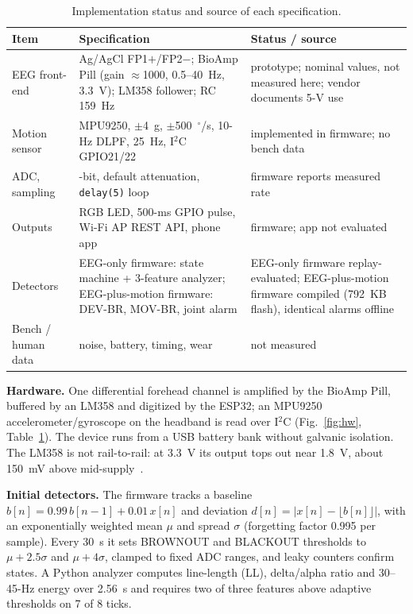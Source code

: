 \documentclass[conference,letterpaper]{IEEEtran}
\begin{document}
\begin{table}[t]
\centering
\caption{Implementation status and source of each specification.}
\label{tab:status}
\footnotesize
\setlength{\tabcolsep}{2pt}
\begin{tabular}{>{\raggedright\arraybackslash}p{}>{\raggedright\arraybackslash}p{}>{\raggedright\arraybackslash}p{}}
\toprule
Item & Specification & Status / source \\
\midrule
EEG front-end & Ag/AgCl FP1$+$/FP2$-$; BioAmp Pill (gain $\approx$1000, 0.5--40~Hz, 3.3~V); LM358 follower; RC 159~Hz & prototype; nominal values, not measured here; vendor documents 5-V use~\cite{bioamp} \\
Motion sensor & MPU9250, $\pm$4~g, $\pm$500~$^\circ$/s, 10-Hz DLPF, 25~Hz, I$^2$C GPIO21/22~\cite{mpu9250} & implemented in firmware; no bench data \\
ADC, sampling & 12-bit, default attenuation, \texttt{delay(5)} loop & firmware reports measured rate \\
Outputs & RGB LED, 500-ms GPIO pulse, Wi-Fi AP REST API, phone app & firmware; app not evaluated \\
Detectors & EEG-only firmware: state machine + 3-feature analyzer; EEG-plus-motion firmware: DEV-BR, MOV-BR, joint alarm & EEG-only firmware replay-evaluated; EEG-plus-motion firmware compiled (792~KB flash), identical alarms offline \\
Bench / human data & noise, battery, timing, wear & not measured \\
\bottomrule
\end{tabular}
\end{table}

\textbf{Hardware.} One differential forehead channel is amplified by the BioAmp Pill, buffered by an LM358 and digitized by the ESP32; an MPU9250 accelerometer/gyroscope on the headband is read over I$^2$C (Fig.~\ref{fig:hw}, Table~\ref{tab:status}). The device runs from a USB battery bank without galvanic isolation. The LM358 is not rail-to-rail: at 3.3~V its output tops out near 1.8~V, about 150~mV above mid-supply~\cite{lm358}.

\textbf{Initial detectors.} The firmware tracks a baseline $b[n]{=}0.99\,b[n{-}1]{+}0.01\,x[n]$ and deviation $d[n]{=}|x[n]-\lfloor b[n]\rfloor|$, with an exponentially weighted mean $\mu$ and spread $\sigma$ (forgetting factor 0.995 per sample). Every 30~s it sets BROWNOUT and BLACKOUT thresholds to $\mu{+}2.5\sigma$ and $\mu{+}4\sigma$, clamped to fixed ADC ranges, and leaky counters confirm states. A Python analyzer computes line-length (LL), delta/alpha ratio and 30--45-Hz energy over 2.56~s and requires two of three features above adaptive thresholds on 7 of 8 ticks.
\end{document}

